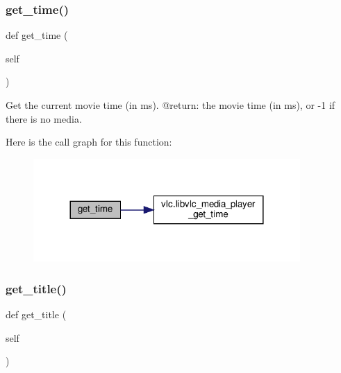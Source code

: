 \subsubsection{\texorpdfstring{get\+\_\+time()}{get\_time()}}
{\footnotesize\ttfamily def get\+\_\+time (\begin{DoxyParamCaption}\item[{}]{self }\end{DoxyParamCaption})}

\begin{DoxyVerb}Get the current movie time (in ms).
@return: the movie time (in ms), or -1 if there is no media.
\end{DoxyVerb}
 Here is the call graph for this function\+:
\nopagebreak
\begin{figure}[H]
\begin{center}
\leavevmode
\includegraphics[width=288pt]{classvlc_1_1_media_player_a1d6ad4954dd4e8488d5cc7dcfceb2faa_cgraph}
\end{center}
\end{figure}
\mbox{\label{classvlc_1_1_media_player_a49f200bc32e91377ec9f649ddda7bb5b}} 
\subsubsection{\texorpdfstring{get\+\_\+title()}{get\_title()}}
{\footnotesize\ttfamily def get\+\_\+title (\begin{DoxyParamCaption}\item[{}]{self }\end{DoxyParamCaption})}

